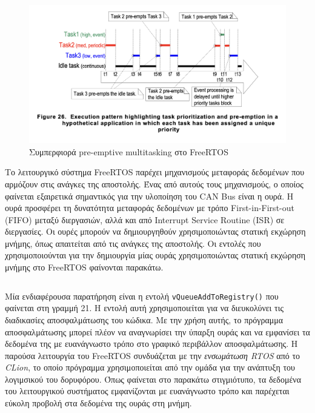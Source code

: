 \documentclass[a4paper,nobib,justified]{tufte-book}
\begin{document}
\begin{figure}[ht]
	\includegraphics{media/diagrams/freeRTOS-preemptive-multitasking.png}
	\caption{Συμπερφιορά pre-emptive multitasking στο FreeRTOS}
	\label{fig:freeRTOS-preemptive-multitasking}
\end{figure}

Το λειτουργικό σύστημα FreeRTOS παρέχει μηχανισμούς μεταφοράς δεδομένων που αρμόζουν στις ανάγκες της αποστολής. Ένας από αυτούς τους μηχανισμούς, ο οποίος φαίνεται εξαιρετικά σημαντικός για την υλοποίηση του CAN Bus είναι η ουρά. Η ουρά προσφέρει τη δυνατότητα μεταφοράς δεδομένων με τρόπο First-in-First-out (FIFO) μεταξύ διεργασιών, αλλά και από Interrupt Service Routine (ISR) σε διεργασίες. Οι ουρές μπορούν να δημιουργηθούν χρησιμοποιώντας στατική εκχώρηση μνήμης, όπως απαιτείται από τις ανάγκες της αποστολής. Οι εντολές που χρησιμοποιούνται για την δημιουργία μίας ουράς χρησιμοποιώντας στατική εκχώρηση μνήμης στο FreeRTOS φαίνονται παρακάτω.
\inputminted{c++}{code/examples/gatekeeper-queue.cpp}

\label{sec:queue-registry}
Μία ενδιαφέρουσα παρατήρηση είναι η εντολή \texttt{vQueueAddToRegistry()} που φαίνεται στη γραμμή 21. Η εντολή αυτή χρησιμοποιείται για να διευκολύνει τις διαδικασίες αποσφαλμάτωσης του κώδικα. Με την χρήση αυτής, το πρόγραμμα αποσφαλμάτωσης μπορεί πλέον να αναγνωρίσει την ύπαρξη ουράς και να εμφανίσει τα δεδομένα της με ευανάγνωστο τρόπο στο γραφικό περιβάλλον αποσφαλμάτωσης. Η παρούσα λειτουργία του FreeRTOS συνδυάζεται με την \emph{ενσωμάτωση RTOS} από το \emph{CLion}, το οποίο πρόγραμμα χρησιμοποιείται από την ομάδα για την ανάπτυξη του λογιμσικού του δορυφόρου. Όπως φαίνεται στο παρακάτω στιγμιότυπο, τα δεδομένα του λειτουργικού συστήματος εμφανίζονται με ευανάγνωστο τρόπο και παρέχεται εύκολη προβολή στα δεδομένα της ουράς στη μνήμη. 
\end{document}
